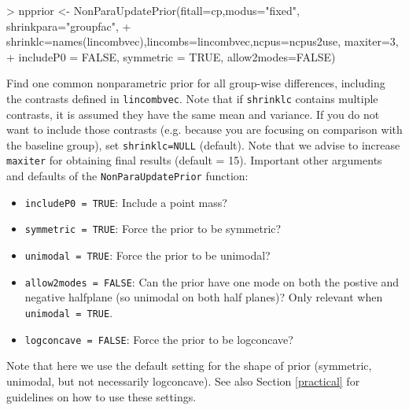 \documentclass[11pt]{article}
\begin{document}
\begin{Schunk}
\begin{Sinput}
> npprior <- NonParaUpdatePrior(fitall=cp,modus="fixed", shrinkpara="groupfac",
+ shrinklc=names(lincombvec),lincombs=lincombvec,ncpus=ncpus2use, maxiter=3,
+ includeP0 = FALSE, symmetric = TRUE, allow2modes=FALSE)
\end{Sinput}
\end{Schunk}
Find one common nonparametric prior for all group-wise differences, including the contrasts defined in {\tt lincombvec}. Note that
if {\tt shrinklc} contains multiple contrasts, it is assumed they have the same mean and variance.
If you do not want to include those contrasts (e.g. because you are focusing on comparison with the baseline group), set
{\tt shrinklc=NULL} (default). Note that we advise to increase {\tt maxiter} for obtaining final results (default = 15).
Important other arguments and defaults of the {\tt NonParaUpdatePrior} function:
\begin{itemize}
\item {\tt includeP0 = TRUE}: Include a point mass?
\item {\tt symmetric = TRUE}: Force the prior to be symmetric?
\item {\tt unimodal = TRUE}: Force the prior to be unimodal?
\item {\tt allow2modes = FALSE}: Can the prior have one mode on both the postive and negative halfplane (so unimodal on both half planes)?
Only relevant when {\tt unimodal = TRUE}.
\item {\tt logconcave = FALSE}: Force the prior to be logconcave?
\end{itemize}
Note that here we use the default setting for the shape of prior (symmetric, unimodal, but not necessarily logconcave).
See also Section \ref{practical} for guidelines on how to use these settings.
\end{document}
